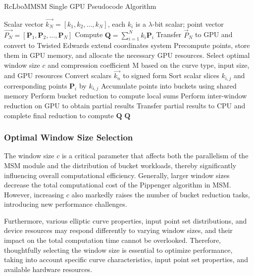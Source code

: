 \documentclass[conference]{IEEEtran}
\begin{document}
\begin{algorithm}
    \caption{RcLboMMSM Single GPU Pseudocode Algorithm}
    \label{alg:rclbomsm-single-gpu}
    \begin{algorithmic}[1]
    \REQUIRE Scalar vector $\overrightarrow{k_N} = [k_1, k_2, \ldots, k_N]$, each $k_i$ is a $\lambda$-bit scalar; point vector $\overrightarrow{P_N} = [\mathbf{P}_1, \mathbf{P}_2, \ldots, \mathbf{P}_N]$
    \ENSURE Compute $\mathbf{Q} = \sum_{i=1}^{N} k_i \mathbf{P}_i$
    \STATE Transfer $\overrightarrow{P}_N$ to GPU and convert to Twisted Edwards extend coordinates system
    \STATE Precompute points, store them in GPU memory, and allocate the necessary GPU resources.
    \STATE Select optimal window size $c$ and compression coefficient M based on the curve type, input size, and GPU resources
    \STATE Convert scalars $\overrightarrow{k_n}$ to signed form 
        \STATE Sort scalar slices $k_{i,j}$ and corresponding points $\mathbf{P}_i$ by $k_{i,j}$
        \STATE Accumulate points into buckets using shared memory 
        \STATE Perform bucket reduction to compute local sums 
    \ENDFOR
    \STATE Perform inter-window reduction on GPU to obtain partial results
    \STATE Transfer partial results to CPU and complete final reduction to compute $\mathbf{Q}$
    \RETURN $\mathbf{Q}$
    \end{algorithmic}
\end{algorithm}
\subsubsection{\textbf{Optimal Window Size Selection}}

The window size \( c \) is a critical parameter that affects both the parallelism of the MSM module and the distribution of bucket workloads, thereby significantly influencing overall computational efficiency. Generally, larger window sizes decrease the total computational cost of the Pippenger algorithm in MSM. However, increasing \( c \) also markedly raises the number of bucket reduction tasks, introducing new performance challenges.

Furthermore, various elliptic curve properties, input point set distributions, and device resources may respond differently to varying window sizes, and their impact on the total computation time cannot be overlooked. Therefore, thoughtfully selecting the window size is essential to optimize performance, taking into account specific curve characteristics, input point set properties, and available hardware resources.
\end{document}
